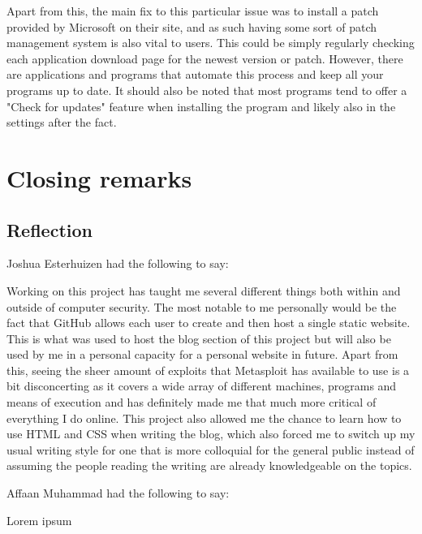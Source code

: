 \documentclass[a4paper, 12pt, titlepage]{report}
\begin{document}
Apart from this, the main fix to this particular issue was to install a patch provided by Microsoft on their site, and as such having some sort of patch management system is also vital to users. This could be simply regularly checking each application download page for the newest version or patch. However, there are applications and programs that automate this process and keep all your programs up to date. It should also be noted that most programs tend to offer a "Check for updates" feature when installing the program and likely also in the settings after the fact. 

\chapter{Closing remarks}
\section{Reflection}
Joshua Esterhuizen had the following to say:
\begin{displayquote}
Working on this project has taught me several different things both within and outside of computer security. The most notable to me personally would be the fact that GitHub allows each user to create and then host a single static website. This is what was used to host the blog section of this project but will also be used by me in a personal capacity for a personal website in future. Apart from this, seeing the sheer amount of exploits that Metasploit has available to use is a bit disconcerting as it covers a wide array of different machines, programs and means of execution and has definitely made me that much more critical of everything I do online. This project also allowed me the chance to learn how to use HTML and CSS when writing the blog, which also forced me to switch up my usual writing style for one that is more colloquial for the general public instead of assuming the people reading the writing are already knowledgeable on the topics.
\end{displayquote}
Affaan Muhammad had the following to say:
\begin{displayquote}
Lorem ipsum
\end{displayquote}
\end{document}

